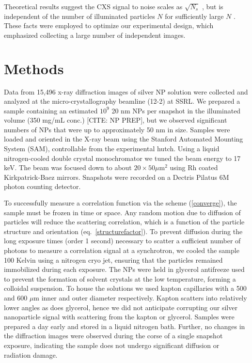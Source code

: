 \documentclass [11pt,fleqn]{article}
\begin{document}
Theoretical results suggest the CXS signal to noise scales as $\sqrt{N_{s}}$ , but is independent of the number of illuminated particles $N$ for sufficiently large $N$ \cite{Kam:1977wc, Kam:1981ua, Kirian:2011bq}. These facts were employed to optimize our experimental design, which emphasized collecting a large number of independent images.

\section{Methods}

Data from 15,496 x-ray diffraction images of silver NP solution were collected and analyzed at the micro-crystallography beamline (12-2) at SSRL. We prepared a sample containing an estimated $10^{9}$  20 nm NPs per snapshot in the illuminated volume (350 mg/mL conc.) [CITE: NP PREP], but we observed significant numbers of NPs that were up to approximately 50 nm in size. Samples were loaded and oriented in the X-ray beam using the Stanford Automated Mounting System (SAM), controllable from the experimental hutch. Using a liquid nitrogen-cooled double crystal monochromator we tuned the beam energy to 17 keV. The beam was focused down to about $20 \times 50 \mu$m$^2$ using Rh coated Kirkpatrick-Baez mirrors. Snapshots were recorded on a Dectris Pilatus 6M photon counting detector. 

To successfully measure a correlation function via the scheme (\ref{converge}), the sample must be frozen in time or space. Any random motion due to diffusion of particles will reduce the scattering correlation, which is a function of the particle structure and orientation (eq.~\ref{structurefactor}). To prevent diffusion during the long exposure times (order 1 second) necessary to scatter a sufficient number of photons to measure a correlation signal at a synchrotron, we cooled the sample 100 Kelvin using a nitrogen cryo jet, ensuring that the particles remained immobilized during each exposure. The NPs were held in glycerol antifreeze used to prevent the formation of solvent crystals at the low temperature, forming a colloidal suspension. To house the solutions we used kapton capillaries with a 500 and 600 $\mu$m inner and outer diameter respectively. Kapton scatters into relatively lower angles as does glycerol, hence we did not anticipate corrupting our silver nanoparticle signal with scattering from the kapton or glycerol. Samples were prepared a day early and stored in a liquid nitrogen bath. Further, no changes in the diffraction images were observed during the corse of a single snapshot exposure, indicating the sample does not undergo significant diffusion or radiation damage.
\end{document}
